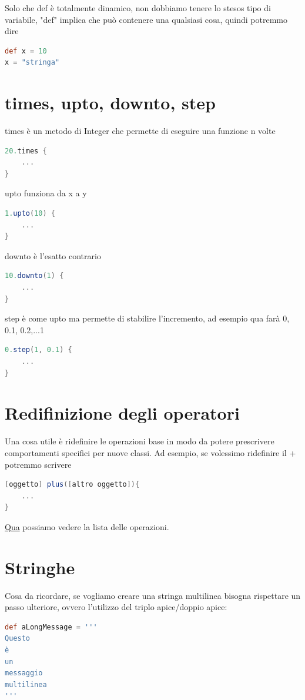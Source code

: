 \documentclass[11pt,a4paper]{book}
\begin{document}
Solo che def è totalmente dinamico, non dobbiamo tenere lo stesos tipo di variabile, "def" implica che può contenere una qualsiasi cosa, quindi potremmo dire
\begin{lstlisting}[language = groovy]
def x = 10
x = "stringa"
\end{lstlisting}

\section{times, upto, downto, step}
times è un metodo di Integer che permette di eseguire una funzione n volte
\begin{lstlisting}[language = groovy]
20.times {
	...
}
\end{lstlisting}

upto funziona da x a y
\begin{lstlisting}[language = groovy]
1.upto(10) {
	...
}
\end{lstlisting}

downto è l'esatto contrario
\begin{lstlisting}[language = groovy]
10.downto(1) {
	...
}
\end{lstlisting}

step è come upto ma permette di stabilire l'incremento, ad esempio qua farà 0, 0.1, 0.2,...1
\begin{lstlisting}[language = groovy]
0.step(1, 0.1) {
	...
}
\end{lstlisting}

\section{Redifinizione degli operatori}
Una cosa utile è ridefinire le operazioni base in modo da potere prescrivere comportamenti specifici per nuove classi. Ad esempio, se volessimo ridefinire il + potremmo scrivere
\begin{lstlisting}[language = groovy]
[oggetto] plus([altro oggetto]){
	...
}
\end{lstlisting}

\href{https://groovy-lang.org/operators.html#Operator-Overloading}{Qua} possiamo vedere la lista delle operazioni.

\section{Stringhe}
Cosa da ricordare, se vogliamo creare una stringa multilinea bisogna rispettare un passo ulteriore, ovvero l'utilizzo del triplo apice/doppio apice:
\begin{lstlisting}[language = groovy]
def aLongMessage = '''
Questo
è
un
messaggio
multilinea
'''
\end{lstlisting}
\end{document}
